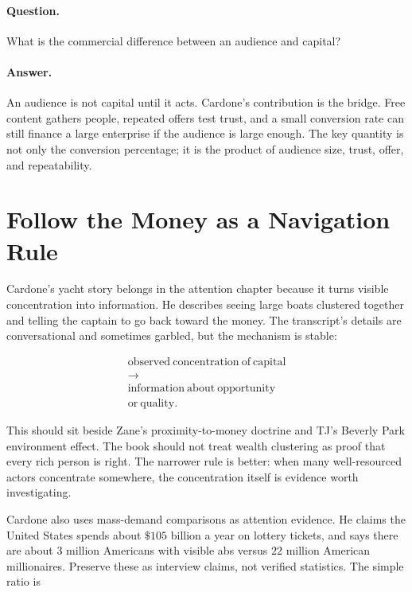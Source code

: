 \documentclass[11pt,oneside]{book}
\begin{document}
\paragraph{Question.}
What is the commercial difference between an audience and capital?

\paragraph{Answer.}
An audience is not capital until it acts. Cardone's contribution is the bridge. Free content gathers people, repeated offers test trust, and a small conversion rate can still finance a large enterprise if the audience is large enough. The key quantity is not only the conversion percentage; it is the product of audience size, trust, offer, and repeatability.

\section{Follow the Money as a Navigation Rule}

Cardone's yacht story belongs in the attention chapter because it turns visible concentration into information. He describes seeing large boats clustered together and telling the captain to go back toward the money. The transcript's details are conversational and sometimes garbled, but the mechanism is stable:

\begin{equation}
\begin{gathered}
\mathrm{observed\ concentration\ of\ capital}\\
\longrightarrow\\
\mathrm{information\ about\ opportunity}\\
\mathrm{or\ quality}.
\end{gathered}
\end{equation}

This should sit beside Zane's proximity-to-money doctrine and TJ's Beverly Park environment effect. The book should not treat wealth clustering as proof that every rich person is right. The narrower rule is better: when many well-resourced actors concentrate somewhere, the concentration itself is evidence worth investigating.

Cardone also uses mass-demand comparisons as attention evidence. He claims the United States spends about \(\$105\) billion a year on lottery tickets, and says there are about \(3\) million Americans with visible abs versus \(22\) million American millionaires. Preserve these as interview claims, not verified statistics. The simple ratio is
\end{document}

